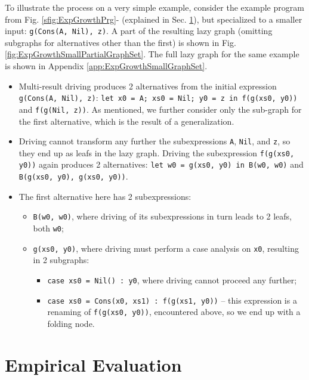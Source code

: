 \documentclass[submission,copyright,creativecommons]{eptcs}
\begin{document}
To illustrate the process on a very simple example, consider the example program from 
Fig. \ref{sfig:ExpGrowthPrg}- (explained in Sec. \ref{sec:EmpEval}), 
but specialized to a smaller input: \verb|g(Cons(A, Nil), z)|.
A part of the resulting lazy graph (omitting subgraphs for alternatives other than the first)
is shown in Fig. \ref{fig:ExpGrowthSmallPartialGraphSet}.
The full lazy graph for the same example is shown in Appendix \ref{app:ExpGrowthSmallGraphSet}.
\begin{itemize}
  \item Multi-result driving produces 2 alternatives from the initial expression \verb|g(Cons(A, Nil), z)|:
    \verb|let x0 = A; xs0 = Nil; y0 = z in f(g(xs0, y0))| and \verb|f(g(Nil, z))|.
    As mentioned, we further consider only the sub-graph for the first alternative, which
    is the result of a generalization.
  \item Driving cannot transform any further the subexpressions \verb|A|, \verb|Nil|, and \verb|z|, 
    so they end up as leafs in the lazy graph.
    Driving the subexpression \verb|f(g(xs0, y0))| again produces 2 alternatives:
    \verb|let w0 = g(xs0, y0) in B(w0, w0)| and \verb|B(g(xs0, y0), g(xs0, y0))|.
  \item The first alternative here has 2 subexpressions: 
    \begin{itemize}
      \item \verb|B(w0, w0)|, where driving of its subexpressions in turn leads to 2 leafs, both \verb|w0|;
      \item \verb|g(xs0, y0)|, where driving must perform a case analysis on \verb|x0|, resulting in 2 subgraphs:
      \begin{itemize}
        \item \verb|case xs0 = Nil() : y0|, where driving cannot proceed any further;
        \item \verb|case xs0 = Cons(x0, xs1) : f(g(xs1, y0))| -- this expression is a renaming of
          \verb|f(g(xs0, y0))|, encountered above, so we end up with a folding node.
      \end{itemize}
    \end{itemize}
\end{itemize}

\section{Empirical Evaluation}\label{sec:EmpEval}
\end{document}
